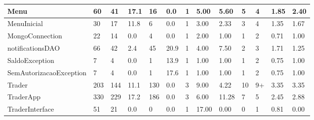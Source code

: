 \begin{table}[ht]
\begin{adjustbox}{width=1\textwidth}
\begin{tabular}{|l|l|l|l|l|l|l|l|l|l|l|l|l|}
Menu                         & 60           & 41         & 17.1            & 16       & 0.0            & 1       & 5.00            & 5.60                       & 5                   & 4                   & 1.85               & 2.40               \\ \hline
MenuInicial                  & 30           & 17         & 11.8            & 6        & 0.0            & 1       & 3.00            & 2.33                       & 3                   & 4                   & 1.35               & 1.67               \\ \hline
MongoConnection              & 22           & 14         & 0.0             & 4        & 0.0            & 1       & 2.00            & 1.00                       & 1                   & 2                   & 0.71               & 1.00               \\ \hline
notificationsDAO             & 66           & 42         & 2.4             & 45       & 20.9           & 1       & 4.00            & 7.50                       & 2                   & 3                   & 1.71               & 1.25               \\ \hline
SaldoException               & 7            & 4          & 0.0             & 1        & 13.9           & 1       & 1.00            & 1.00                       & 1                   & 2                   & 0.75               & 1.00               \\ \hline
SemAutorizacaoException      & 7            & 4          & 0.0             & 1        & 17.6           & 1       & 1.00            & 1.00                       & 1                   & 2                   & 0.75               & 1.00               \\ \hline
Trader                       & 203          & 144        & 11.1            & 130      & 0.0            & 3       & 9.00            & 4.22                       & 10                  & 9+                  & 3.35               & 3.35               \\ \hline
TraderApp                    & 330          & 229        & 17.2            & 186      & 0.0            & 3       & 6.00            & 11.28                      & 7                   & 5                   & 2.45               & 2.88               \\ \hline
TraderInterface              & 51           & 21         & 0.0             & 0        & 0.0            & 1       & 17.00           & 0.00                       & 0                   & 1                   & 0.81               & 0.00               \\ \hline

\end{tabular}
\end{adjustbox}
\end{table}
